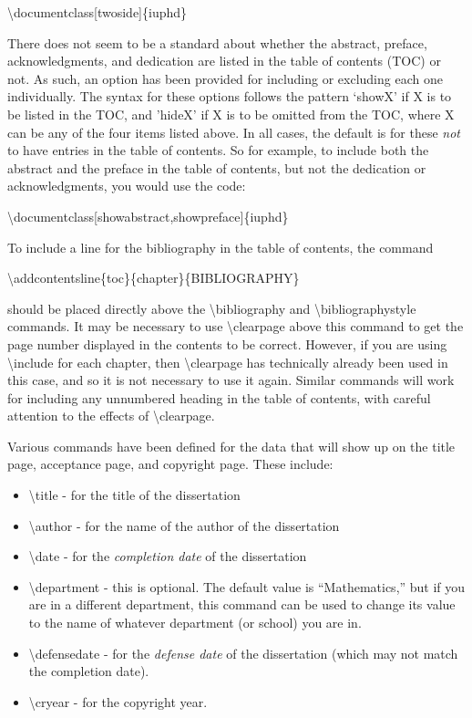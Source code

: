 \textbackslash documentclass[twoside]\{iuphd\}
\medskip

There does not seem to be a standard about whether the abstract, preface, acknowledgments, and dedication are listed in the table of
contents (TOC) or not.  As such, an option has been provided for including or excluding each one individually.  The syntax for these options
follows the pattern `showX' if X is to be listed in the TOC, and 'hideX' if X is to be omitted from the TOC, where X can be any of the four
items listed above.  In all cases, the default is for these \emph{not} to have entries in the table of contents.  So for example, to include
both the abstract and the preface in the table of contents, but not the dedication or acknowledgments, you would use the code:
\medskip

\textbackslash documentclass[showabstract,showpreface]\{iuphd\}
\medskip

\noindent To include a line for the bibliography in the table of contents, the command
\medskip

\textbackslash addcontentsline\{toc\}\{chapter\}\{BIBLIOGRAPHY\}
\medskip

\noindent should be placed directly above the \textbackslash bibliography and \textbackslash bibliographystyle commands.  It may be necessary
to use \textbackslash clearpage above this command to get the page number displayed in the contents to be correct.  However, if you are using
\textbackslash include for each chapter, then \textbackslash clearpage has technically already been used in this case, and so it is not
necessary to use it again. Similar commands will work for including any unnumbered heading in the table of contents, with careful attention
to the effects of \textbackslash clearpage.

Various commands have been defined for the data that will show up on the title page, acceptance page, and copyright page.  These include:
\begin{itemize}
 \item \textbackslash title - for the title of the dissertation
 \item \textbackslash author - for the name of the author of the dissertation
 \item \textbackslash date - for the \emph{completion date} of the dissertation
 \item \textbackslash department - this is optional.  The default value is ``Mathematics,'' but if you are in a different department, this
        command can be used to change its value to the name of whatever department (or school) you are in.  
 \item \textbackslash defensedate - for the \emph{defense date} of the dissertation (which may not match the completion date).
 \item \textbackslash cryear - for the copyright year.
\end{itemize}

